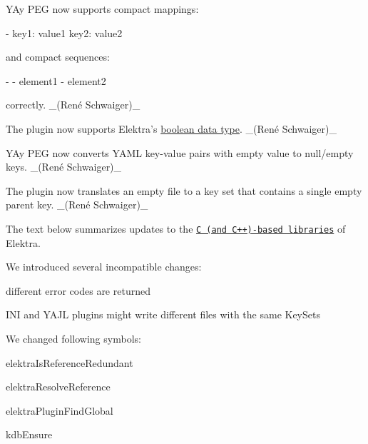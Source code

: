 \begin{DoxyItemize}
\item Y\+Ay P\+EG now supports compact mappings\+:
\end{DoxyItemize}


\begin{DoxyCode}
- key1: value1
  key2: value2
\end{DoxyCode}


and compact sequences\+:


\begin{DoxyCode}
- - element1
  - element2
\end{DoxyCode}


correctly. \+\_\+(René Schwaiger)\+\_\+


\begin{DoxyItemize}
\item The plugin now supports Elektra’s \hyperlink{doc_decisions_boolean_md}{boolean data type}. \+\_\+(René Schwaiger)\+\_\+
\item Y\+Ay P\+EG now converts Y\+A\+ML key-\/value pairs with empty value to null/empty keys. \+\_\+(René Schwaiger)\+\_\+
\item The plugin now translates an empty file to a key set that contains a single empty parent key. \+\_\+(René Schwaiger)\+\_\+
\end{DoxyItemize}

The text below summarizes updates to the \href{https://www.libelektra.org/libraries/readme}{\tt C (and C++)-\/based libraries} of Elektra.

We introduced several incompatible changes\+:


\begin{DoxyItemize}
\item different error codes are returned
\item I\+NI and Y\+A\+JL plugins might write different files with the same Key\+Sets
\end{DoxyItemize}

We changed following symbols\+:


\begin{DoxyItemize}
\item elektra\+Is\+Reference\+Redundant
\item elektra\+Resolve\+Reference
\item elektra\+Plugin\+Find\+Global
\item kdb\+Ensure
\end{DoxyItemize}


